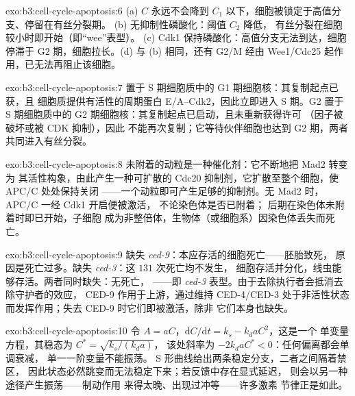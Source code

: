 \begin{solution}{exo:b3:cell-cycle-apoptosis:6}
(a) $C$ 永远不会降到 $C_{1}$ 以下，细胞被锁定于高值分支、停留在有丝分裂期。
(b) 无抑制性磷酸化：阈值 $C_{2}$ 降低，
有丝分裂在细胞较小时即开始（即“wee”表型）。
(c) Cdk1 保持磷酸化：高值分支无法到达，细胞停滞于
G2 期，细胞拉长。(d) 与 (b) 相同，还有 G2/M 
经由 Wee1/Cdc25 起作用，已无法再阻止该细胞。
\end{solution}

\begin{solution}{exo:b3:cell-cycle-apoptosis:7}
置于 S 期细胞质中的 G1 期细胞核：其复制起点已获，且
细胞质提供有活性的周期蛋白 E/A--Cdk2，因此立即进入 S 期。G2
置于 S 期细胞质中的 G2 期细胞核：其复制起点已启动，且未重新获得许可
（因子被破坏或被 CDK 抑制），因此
不能再次复制；它等待伙伴细胞也达到 G2 期，两者
共同进入有丝分裂。
\end{solution}

\begin{solution}{exo:b3:cell-cycle-apoptosis:8}
未附着的动粒是一种催化剂：它不断地把 Mad2 转变为
其活性构象，由此产生一种可扩散的
Cdc20 抑制剂，它扩散至整个细胞，使 APC/C 处处保持关闭
——一个动粒即可产生足够的抑制剂。无 Mad2 时，APC/C 一经 Cdk1 开启便被激活，
不论染色体是否已附着；
后期在染色体未附着时即已开始，子细胞
成为非整倍体，生物体（或细胞系）因染色体丢失而死亡。
\end{solution}

\begin{solution}{exo:b3:cell-cycle-apoptosis:9}
缺失 \emph{ced-9}：本应存活的细胞死亡——胚胎致死，
原因是死亡过多。缺失 \emph{ced-3}：这 $131$ 次死亡均不发生，
细胞存活并分化，线虫能够存活。两者同时缺失：无死亡，
——即 \emph{ced-3} 表型。由于去除执行者会抵消去除守护者的效应，
CED-9 作用于上游，通过维持
CED-4/CED-3 处于非活性状态而发挥作用；失去 CED-9 时它们即被激活，除非
它们本身也缺失。
\end{solution}

\begin{solution}{exo:b3:cell-cycle-apoptosis:10}
令 $A = aC$，$\mathrm{d}C/\mathrm{d}t = k_{s} - k_{d}aC^{2}$，这是一个
单变量方程，其稳态为 $C^{*} = \sqrt{k_{s}/(k_{d}a)}$，
该处斜率为 $-2k_{d}aC^{*} < 0$：任何偏离都会单调衰减，
单一一阶变量不能振荡。
S 形曲线给出两条稳定分支，二者之间隔着禁区，
因此状态必然跳变而无法稳定下来；若反馈中存在显式延迟，
则会以另一种途径产生振荡——制动作用
来得太晚、出现过冲等——许多激素
节律正是如此。
\end{solution}

